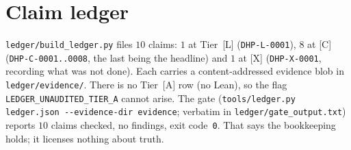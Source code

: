 \documentclass[10pt]{article}
\newcommand{\tier}[1]{\textsf{[#1]}}
\newcommand{\tA}{\tier{A}}
\newcommand{\tC}{\tier{C}}
\newcommand{\tL}{\tier{L}}
\newcommand{\tX}{\tier{X}}
\begin{document}
\section{Claim ledger}\label{sec:ledger}
\texttt{ledger/build\_ledger.py} files $10$ claims: $1$ at Tier~\tL{} (\texttt{DHP-L-0001}), $8$ at \tC{} (\texttt{DHP-C-0001..0008}, the last being the headline) and $1$ at \tX{} (\texttt{DHP-X-0001}, recording what was not done). Each carries a content-addressed evidence blob in \texttt{ledger/evidence/}. There is no Tier~\tA{} row (no Lean), so the flag \texttt{LEDGER\_UNAUDITED\_TIER\_A} cannot arise. The gate (\texttt{tools/ledger.py ledger.json -{}-evidence-dir evidence}; verbatim in \texttt{ledger/gate\_output.txt}) reports $10$ claims checked, no findings, exit code~\texttt{0}. That says the bookkeeping holds; it licenses nothing about truth.

\end{document}
